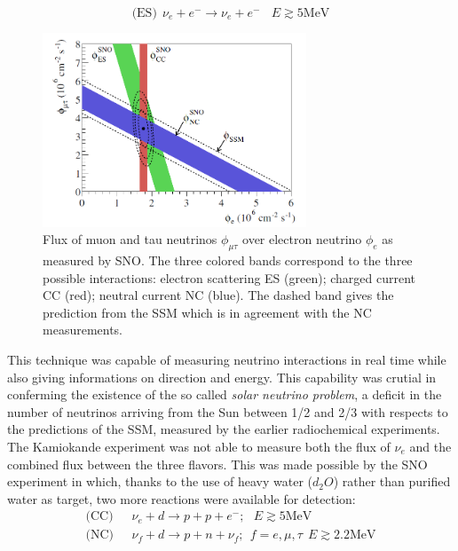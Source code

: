 \documentclass[12pt,a4paper,openright,twoside]{report}
\begin{document}
\begin{equation}
\text{(ES)} \ \ \nu_e + e^- \rightarrow \nu_e + e^- \ \ \ \ E\gtrsim 5 \text{MeV}
\end{equation}
\begin{figure}[t]
	\centering
	\includegraphics[width=0.7\textwidth]{SNO.png}
	\caption{\label{SNO:fig} Flux of muon and tau neutrinos $\phi_{\mu\tau}$ over electron neutrino $\phi_e$ as measured by SNO. The three colored bands correspond to the three possible interactions: electron scattering ES (green); charged current CC (red); neutral current NC (blue). The dashed band gives the prediction from the SSM which is in agreement with the NC measurements.   }
\end{figure}
This technique was capable of measuring neutrino interactions in real time while also giving informations on direction and energy. This capability was crutial in conferming the existence of the so called \textit{solar neutrino problem}, a deficit in the number of neutrinos arriving from the Sun between 1/2 and 2/3 with respects to the predictions of the SSM, measured by the earlier radiochemical experiments. \\
The Kamiokande experiment was not able to measure both the flux of $\nu_e$ and the combined flux between the three flavors. This was made possible by the SNO experiment in which, thanks to the use of heavy water ($d_2O$) rather than purified water as target, two more reactions were available for detection:
\begin{equation}
\begin{split}
\text{(CC)} & \ \ \ \nu_e+d \rightarrow p+p+e^-; \ \ \ E\gtrsim\text{5MeV} \\
\text{(NC)} & \ \ \ \nu_f+d \rightarrow p+n+\nu_f; \ \  f=e,\mu,\tau  \ \ E\gtrsim\text{2.2MeV}
\end{split}
\end{equation}  
\end{document}
